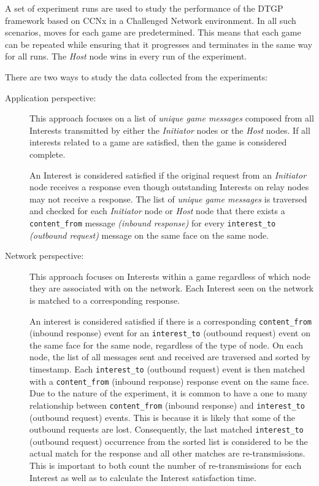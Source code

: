 \documentclass[a4paper,12pt]{report}      %
\begin{document}
A set of experiment runs are used to study the performance of the DTGP framework based on CCNx in a Challenged Network environment.
In all such scenarios, moves for each game are predetermined. This means that each game can be repeated
 while ensuring that it progresses and terminates in the same way for all runs. The \emph{Host} node wins in every run of the experiment. 

\noindent There are two ways to study the data collected from the experiments:

\begin{description}
\item[Application perspective:] This approach focuses on a list of \textsl{unique game messages} composed from
all Interests transmitted by either the \emph{Initiator} nodes or the \emph{Host} nodes. If all interests related to a
game are satisfied, then the game is considered complete.

An Interest is considered satisfied if the original request from an \emph{Initiator} node receives a 
response even though outstanding Interests on relay nodes may not receive a response. The list
of \textsl{unique game messages} is traversed and checked for each \emph{Initiator} node or \emph{Host} node that there
exists a \verb!content_from! message \textit{(inbound response)} for every 
\verb!interest_to! \textit{(outbound request)} message on the same face on the same node.

\item[Network perspective:] This approach focuses on Interests within a game regardless of which node they are
 associated with on the network. Each Interest seen on the network is matched to a
corresponding response.

An interest is considered satisfied if there is a corresponding \verb!content_from! (inbound response) event
for an \verb!interest_to! (outbound request) event on the same face for the same node, regardless of the type
of node. On each node, the list of all messages sent and received are traversed and sorted by timestamp.
Each \verb!interest_to! (outbound request) event is then matched with a \verb!content_from! (inbound response)
response event on the same face. Due to the nature of the experiment, it is common to have a one to
many relationship between \verb!content_from! (inbound response) and \verb!interest_to! (outbound request) events. This is because it is likely that some of the outbound requests are lost. Consequently, the last matched
\verb!interest_to! (outbound request) occurrence from the sorted list is considered to be the actual match for
the response and all other matches are re-transmissions. This is important to both count the number of
re-transmissions for each Interest as well as to calculate the Interest satisfaction time.
\end{description}
\end{document}
